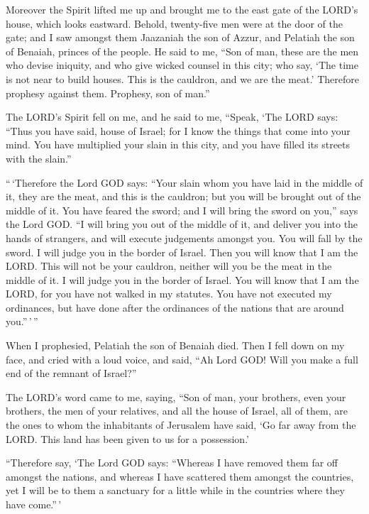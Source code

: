  Moreover the Spirit lifted me up and brought me to the east
gate of the LORD's house, which looks eastward. Behold, twenty-five men
were at the door of the gate; and I saw amongst them Jaazaniah the son
of Azzur, and Pelatiah the son of Benaiah, princes of the people.
 He said to me, ``Son of man, these are the men who devise
iniquity, and who give wicked counsel in this city;  who
say, `The time is not near to build houses. This is the cauldron, and we
are the meat.'  Therefore prophesy against them. Prophesy,
son of man.''

 The LORD's Spirit fell on me, and he said to me, ``Speak,
`The LORD says: ``Thus you have said, house of Israel; for I know the
things that come into your mind.  You have multiplied your
slain in this city, and you have filled its streets with the slain.''

 ``\,`Therefore the Lord GOD says: ``Your slain whom you
have laid in the middle of it, they are the meat, and this is the
cauldron; but you will be brought out of the middle of it. 
You have feared the sword; and I will bring the sword on you,'' says the
Lord GOD.  ``I will bring you out of the middle of it, and
deliver you into the hands of strangers, and will execute judgements
amongst you.  You will fall by the sword. I will judge you
in the border of Israel. Then you will know that I am the LORD.
 This will not be your cauldron, neither will you be the
meat in the middle of it. I will judge you in the border of Israel.
 You will know that I am the LORD, for you have not walked
in my statutes. You have not executed my ordinances, but have done after
the ordinances of the nations that are around you.''\,'\,''

 When I prophesied, Pelatiah the son of Benaiah died. Then
I fell down on my face, and cried with a loud voice, and said, ``Ah Lord
GOD! Will you make a full end of the remnant of Israel?''

 The LORD's word came to me, saying,  ``Son of
man, your brothers, even your brothers, the men of your relatives, and
all the house of Israel, all of them, are the ones to whom the
inhabitants of Jerusalem have said, `Go far away from the LORD. This
land has been given to us for a possession.'

 ``Therefore say, `The Lord GOD says: ``Whereas I have
removed them far off amongst the nations, and whereas I have scattered
them amongst the countries, yet I will be to them a sanctuary for a
little while in the countries where they have come.''\,'

